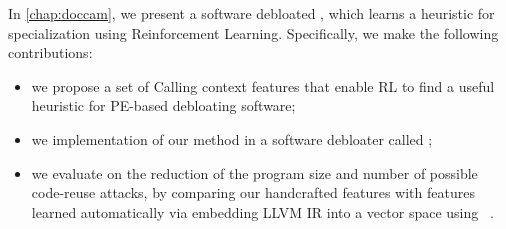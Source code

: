 
In \cref{chap:doccam}, we present a software debloated \doccam, which learns a heuristic for specialization using Reinforcement Learning. Specifically, we make the following contributions: 
\begin{itemize}
    \item we propose a set of Calling context features that enable RL to find a useful heuristic for PE-based debloating software;
    \item we implementation of our method in a software debloater called \doccam;
    \item we evaluate on the reduction of the
program size and number of possible code-reuse attacks, by comparing
our handcrafted features with features learned automatically via
embedding LLVM IR into a vector space using \insttovec~\cite{inst2vec}.
\end{itemize}
